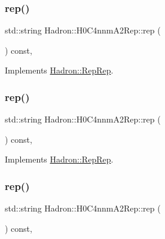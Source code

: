 \subsubsection{\texorpdfstring{rep()}{rep()}\hspace{0.1cm}{\footnotesize\ttfamily [1/3]}}
{\footnotesize\ttfamily std\+::string Hadron\+::\+H0\+C4nnm\+A2\+Rep\+::rep (\begin{DoxyParamCaption}{ }\end{DoxyParamCaption}) const\hspace{0.3cm}{\ttfamily [inline]}, {\ttfamily [virtual]}}



Implements \mbox{\hyperlink{structHadron_1_1RepRep_ab3213025f6de249f7095892109575fde}{Hadron\+::\+Rep\+Rep}}.

\mbox{\label{structHadron_1_1H0C4nnmA2Rep_a7d5e9bf3b8a6abda949a015707a87dff}} 
\subsubsection{\texorpdfstring{rep()}{rep()}\hspace{0.1cm}{\footnotesize\ttfamily [2/3]}}
{\footnotesize\ttfamily std\+::string Hadron\+::\+H0\+C4nnm\+A2\+Rep\+::rep (\begin{DoxyParamCaption}{ }\end{DoxyParamCaption}) const\hspace{0.3cm}{\ttfamily [inline]}, {\ttfamily [virtual]}}



Implements \mbox{\hyperlink{structHadron_1_1RepRep_ab3213025f6de249f7095892109575fde}{Hadron\+::\+Rep\+Rep}}.

\mbox{\label{structHadron_1_1H0C4nnmA2Rep_a7d5e9bf3b8a6abda949a015707a87dff}} 
\subsubsection{\texorpdfstring{rep()}{rep()}\hspace{0.1cm}{\footnotesize\ttfamily [3/3]}}
{\footnotesize\ttfamily std\+::string Hadron\+::\+H0\+C4nnm\+A2\+Rep\+::rep (\begin{DoxyParamCaption}{ }\end{DoxyParamCaption}) const\hspace{0.3cm}{\ttfamily [inline]}, {\ttfamily [virtual]}}



